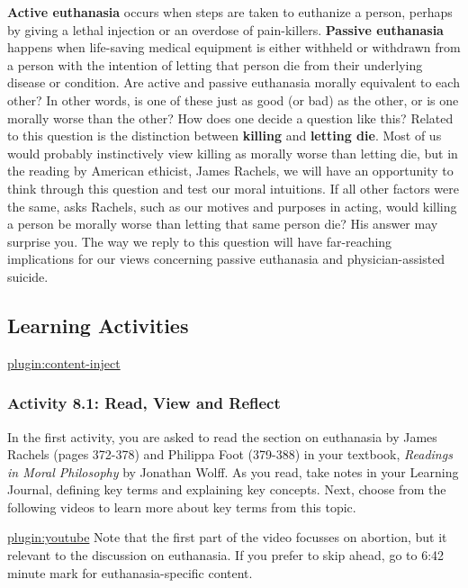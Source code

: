 \documentclass[
]{book}
\begin{document}
\textbf{Active euthanasia} occurs when steps are taken to euthanize a person, perhaps by giving a lethal injection or an overdose of pain-killers. \textbf{Passive euthanasia} happens when life-saving medical equipment is either withheld or withdrawn from a person with the intention of letting that person die from their underlying disease or condition.
Are active and passive euthanasia morally equivalent to each other? In other words, is one of these just as good (or bad) as the other, or is one morally worse than the other? How does one decide a question like this?
Related to this question is the distinction between \textbf{killing} and \textbf{letting die}. Most of us would probably instinctively view killing as morally worse than letting die, but in the reading by American ethicist, James Rachels, we will have an opportunity to think through this question and test our moral intuitions.
If all other factors were the same, asks Rachels, such as our motives and purposes in acting, would killing a person be morally worse than letting that same person die? His answer may surprise you. The way we reply to this question will have far-reaching implications for our views concerning passive euthanasia and physician-assisted suicide.

\hypertarget{learning-activities-19}{%
\subsection{Learning Activities}\label{learning-activities-19}}

\href{../_8-1}{plugin:content-inject}

\hypertarget{activity-8.1-read-view-and-reflect}{%
\subsubsection{Activity 8.1: Read, View and Reflect}\label{activity-8.1-read-view-and-reflect}}

In the first activity, you are asked to read the section on euthanasia by James Rachels (pages 372-378) and Philippa Foot (379-388) in your textbook, \emph{Readings in Moral Philosophy} by Jonathan Wolff. As you read, take notes in your Learning Journal, defining key terms and explaining key concepts.
Next, choose from the following videos to learn more about key terms from this
topic.

\href{https://www.youtube.com/watch?v=3IsloHmKvWA}{plugin:youtube}
Note that the first part of the video focusses on abortion, but it relevant to the discussion on euthanasia. If you prefer to skip ahead, go to 6:42 minute mark for euthanasia-specific content.
\end{document}
